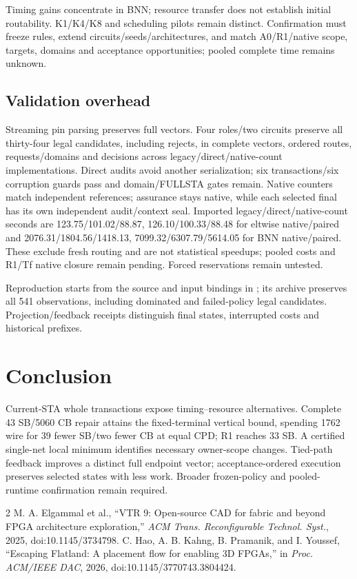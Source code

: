 \documentclass[conference,10pt]{IEEEtran}
\begin{document}
Timing gains concentrate in BNN; resource transfer does not establish initial routability. K1/K4/K8 and scheduling pilots remain distinct. Confirmation must freeze rules, extend circuits/seeds/architectures, and match A0/R1/native scope, targets, domains and acceptance opportunities; pooled complete time remains unknown.

\subsection{Validation overhead}
Streaming pin parsing preserves full vectors. Four roles/two circuits preserve all thirty-four legal candidates, including rejects, in complete vectors, ordered routes, requests/domains and decisions across legacy/direct/native-count implementations. Direct audits avoid another serialization; six transactions/six corruption guards pass and domain/FULLSTA gates remain. Native counters match independent references; assurance stays native, while each selected final has its own independent audit/context seal. Imported legacy/direct/native-count seconds are 123.75/101.02/88.87, 126.10/100.33/88.48 for eltwise native/paired and 2076.31/1804.56/1418.13, 7099.32/6307.79/5614.05 for BNN native/paired. These exclude fresh routing and are not statistical speedups; pooled costs and R1/Tf native closure remain pending. Forced reservations remain untested.

Reproduction starts from the source and input bindings in ; its archive preserves all 541 observations, including dominated and failed-policy legal candidates. Projection/feedback receipts distinguish final states, interrupted costs and historical prefixes.

\section{Conclusion}
Current-STA whole transactions expose timing--resource alternatives. Complete 43 SB/5060 CB repair attains the fixed-terminal vertical bound, spending 1762 wire for 39 fewer SB/two fewer CB at equal CPD; R1 reaches 33 SB. A certified single-net local minimum identifies necessary owner-scope changes. Tied-path feedback improves a distinct full endpoint vector; acceptance-ordered execution preserves selected states with less work. Broader frozen-policy and pooled-runtime confirmation remain required.

\begin{thebibliography}{2}
 M. A. Elgammal et al., ``VTR 9: Open-source CAD for fabric and beyond FPGA architecture exploration,'' \emph{ACM Trans. Reconfigurable Technol. Syst.}, 2025, doi:10.1145/3734798.
 C. Hao, A. B. Kahng, B. Pramanik, and I. Youssef, ``Escaping Flatland: A placement flow for enabling 3D FPGAs,'' in \emph{Proc. ACM/IEEE DAC}, 2026, doi:10.1145/3770743.3804424.
\end{thebibliography}
\end{document}
